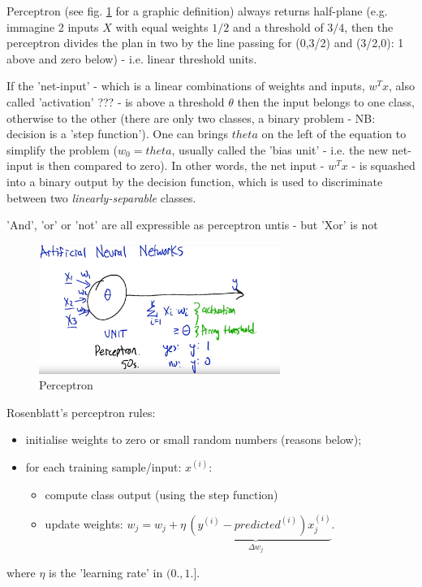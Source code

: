 \documentclass[11pt]{article}
\begin{document}
Perceptron (see fig. \ref{perceptron} for a graphic definition) always returns half-plane (e.g. immagine 2 inputs $X$ with equal weights $1/2$ and a threshold of $3/4$, then the perceptron divides the plan in two by the line passing for (0,3/2) and (3/2,0): 1 above and zero below) - i.e. linear threshold units.

If the 'net-input' - which is a linear combinations of weights and inputs,  $w^T x$, also called 'activation' ??? - is above a threshold $\theta$ then the input belongs to one class, otherwise to the other (there are only two classes, a binary problem - NB: decision is a 'step function'). One can brings $theta$ on the left of the equation to simplify the problem ($w_0 = theta$, usually called the 'bias unit' - i.e. the new net-input is then compared to zero). In other words, the net input - $w^T x$ - is squashed into a binary output by the decision function, which is used to discriminate between two \textit{linearly-separable} classes.

'And', 'or' or 'not' are all expressible as perceptron untis - but 'Xor' is not

\begin{figure}[htbp] 
	\centering
	\includegraphics[width=0.7\textwidth]{pics/perceptron}
	\caption{Perceptron} 
	\label{perceptron}
\end{figure}
Rosenblatt's perceptron rules:
\begin{itemize}
	\item initialise weights to zero or small random numbers (reasons below);
	\item for each training sample/input: $x^{(i)}$:
	\begin{itemize}
		\item compute class output (using the step function)
		\item update weights: $w_j = w_j +  \underbrace{ \eta \, (y^{(i)} - predicted^{(i)}) x_j^{(i)}}_{\Delta w_j}$.
	\end{itemize}
\end{itemize}
where $\eta$ is the 'learning rate' in $(0., 1.]$.
\end{document}
